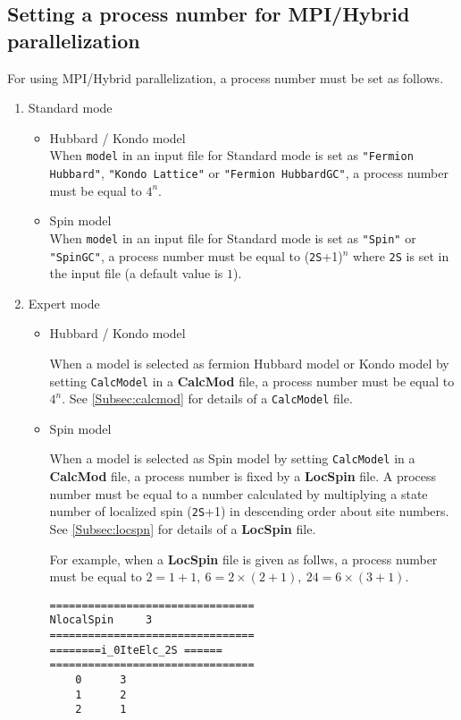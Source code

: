 \newpage
\subsection{Setting a process number for MPI/Hybrid parallelization}
\label{subsec:process}
{For using MPI/Hybrid parallelization, a process number must be set as follows.}
\begin{enumerate}
\item{Standard mode}

\begin{itemize}
\item{Hubbard / Kondo model}\\
When \verb|model| in an input file for Standard mode is set as \verb|"Fermion Hubbard"|, \verb|"Kondo Lattice"| or \verb|"Fermion HubbardGC"|,  a process number must be equal to $4^n$.

\item{Spin model}\\
When \verb|model| in an input file for Standard mode is set as \verb|"Spin"| or \verb|"SpinGC"|,  a process number must be equal to (\verb|2S|+1)${}^n$ where \verb|2S| is set in the input file (a default value is $1$).

\end{itemize}
\item{Expert mode}

\begin{itemize}
\item{Hubbard / Kondo model}

When a model is selected as fermion Hubbard model or Kondo model by setting \verb|CalcModel| in a {\bf CalcMod} file, a process number must be equal to $4^n$.
See \ref{Subsec:calcmod} for details of a \verb|CalcModel| file.

\item{Spin model}

When a model is selected as Spin model by setting \verb|CalcModel| in a {\bf CalcMod} file, a process number is fixed by a {\bf LocSpin} file. A process number must be equal to a number calculated by multiplying a state number of localized spin (\verb|2S|+1) in descending order about site numbers.
See \ref{Subsec:locspn} for details of a {\bf LocSpin} file.

For example, when a {\bf LocSpin} file is given as follws, a process number must be equal to $2=1+1,~6=2\times(2+1),~24=6\times(3+1)$.
\begin{minipage}{10cm}
\begin{screen}
\begin{verbatim}
================================ 
NlocalSpin     3
================================ 
========i_0IteElc_2S ====== 
================================ 
    0      3
    1      2
    2      1
\end{verbatim}
\end{screen}
\end{minipage}


\end{itemize}
\end{enumerate}
